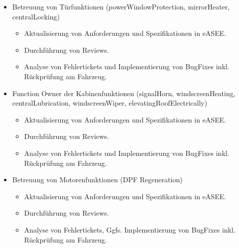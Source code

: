 \documentclass[11pt,a4paper,sans]{moderncv}        %
\begin{document}
{\begin{itemize}
  \item Betreuung von Türfunktionen (powerWindowProtection, mirrorHeater, centralLocking)
  \begin{itemize}
    \item Aktualisierung von Anforderungen und Spezifikationen in eASEE. 
    \item Durchführung von Reviews.
    \item Analyse von Fehlertickets und Implementierung von BugFixes inkl. Rückprüfung am Fahrzeug.    
  \end{itemize} 
  \item Function Owner der Kabinenfunktionen (signalHorn, windscreenHeating, centralLubrication, windscreenWiper, elevatingRoofElectrically)
  \begin{itemize}
    \item Aktualisierung von Anforderungen und Spezifikationen in eASEE. 
    \item Durchführung von Reviews.
    \item Analyse von Fehlertickets und Implementierung von BugFixes inkl. Rückprüfung am Fahrzeug.
  \end{itemize}
  \item Betreuung von Motorenfunktionen (DPF Regeneration)
  \begin{itemize}
    \item Aktualisierung von Anforderungen und Spezifikationen in eASEE. 
    \item Durchführung von Reviews.
    \item Analyse von Fehlertickets, Ggfs. Implementierung von BugFixes inkl. Rückprüfung am Fahrzeug.
  \end{itemize}
\end{itemize}}


\end{document}
